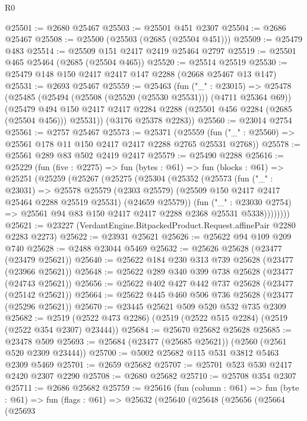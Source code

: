 \begin{lexlean}{R0}
\begin{coremodule}
@25501 := @2680 @25467
@25503 := @25501 @451 @2307
@25504 := @2686 @25467
@25508 := @25500 (@25503 (@2685 (@25504 @451)))
@25509 := @25479 @483
@25514 := @25509 @151 @2417 @2419 @25464 @2797
@25519 := @25501 @465 @25464 (@2685 (@25504 @465))
@25520 := @25514 @25519
@25530 := @25479 @148 @150 @2417 @2417 @147 @2288 (@2668 @25467 @13 @147)
@25531 := @2693 @25467
@25559 := @25463
    (fun ("_" : @23015) =>
    @25478
      (@25485
        (@25494 (@25508 (@25520 (@25530 @25531))) (@4711 @25364 @69))
        (@25479 @494 @150 @2417 @2417 @2284 @2288 (@25501 @456 @2284 (@2685 (@25504 @456))) @25531))
      (@3176 @25378 @2283))
@25560 := @23014 @2754
@25561 := @2757 @25467
@25573 := @25371
    (@25559 (fun ("_" : @25560) => @25561 @178 @11 @150 @2417 @2417 @2288 @2765 @25531 @2768))
@25578 := @25561 @289 @83 @502 @2419 @2417
@25579 := @25490 @2288
@25616 := @25229
    (fun (five : @2275) =>
    fun (bytes : @61) =>
    fun (blocks : @61) =>
    @25251
      (@25259
        (@25267
          (@25275
            (@25304
              (@25352
                (@25573
                  (fun ("_" : @23031) =>
                  @25578
                    @25579
                    (@2303 @25579)
                    (@25509 @150 @2417 @2417 @25464 @2288 @25519 @25531)
                    (@24659 @25579))
                  (fun ("_" : @23030 @2754) =>
                  @25561 @94 @83 @150 @2417 @2417 @2288 @2368 @25531 @5338))))))))
@25621 := @23227 (VerdantEngine.BitpackedProduct.Request.affinePair @2280 @2283 @2273)
@25622 := @23931 @25621
@25626 := @25622 @94 @109 @209 @740
@25628 := @2488 @23044 @5469
@25632 := @25626 @25628 (@23477 (@23479 @25621))
@25640 := @25622 @184 @230 @313 @739 @25628 (@23477 (@23966 @25621))
@25648 := @25622 @289 @340 @399 @738 @25628 (@23477 (@24743 @25621))
@25656 := @25622 @402 @427 @442 @737 @25628 (@23477 (@25142 @25621))
@25664 := @25622 @445 @460 @506 @736 @25628 (@23477 (@25296 @25621))
@25670 := @23445 @25621 @509 @520 @532 @735 @2309
@25682 := @2519 (@2522 @473 @2286) (@2519 (@2522 @515 @2284) (@2519 (@2522 @354 @2307) @23444))
@25684 := @25670 @25682 @25628
@25685 := @23478 @509
@25693 := @25684 (@23477 (@25685 @25621)) (@2560 (@2561 @520 @2309 @23444))
@25700 := @5002 @25682 @115 @531 @3812 @5463 @2309 @5469
@25701 := @2659 @25682
@25707 := @25701 @523 @530 @2417 @2420 @2307 @2290
@25708 := @2680 @25682
@25710 := @25708 @354 @2307
@25711 := @2686 @25682
@25759 := @25616
    (fun (column : @61) =>
    fun (byte : @61) =>
    fun (flags : @61) =>
    @25632
      (@25640
        (@25648
          (@25656
            (@25664
              (@25693

\end{coremodule}
\end{lexlean}
